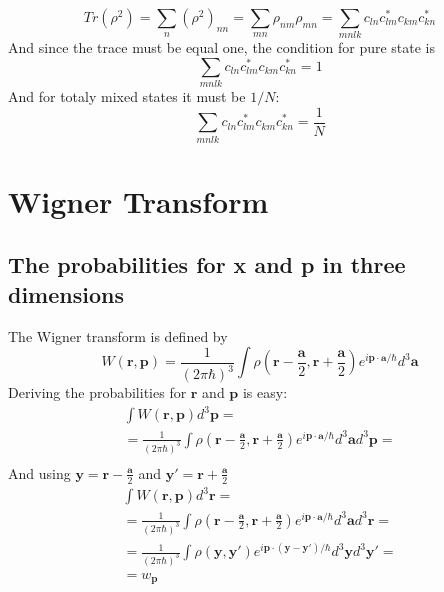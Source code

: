 \documentclass{article}
\begin{document}
\begin{equation}
    Tr(\rho^2) = \sum_n \left(\rho^2\right)_{nn} = \sum_{mn} \rho_{nm} \rho_{mn} = \sum_{mnlk} c_{ln} c_{lm}^* c_{km} c_{kn}^*
\end{equation}
And since the trace must be equal one, the condition for pure state is
\begin{equation}
    \sum_{mnlk} c_{ln} c_{lm}^* c_{km} c_{kn}^* = 1
\end{equation}
And for totaly mixed states it must be $1/N$:
\begin{equation}
    \sum_{mnlk} c_{ln} c_{lm}^* c_{km} c_{kn}^* = \frac{1}{N}
\end{equation}
\section{Wigner Transform}
\subsection{The probabilities for x and p in three dimensions}
The Wigner transform is defined by
\begin{equation}
    W(\boldsymbol{r},\boldsymbol{p}) = \frac{1}{(2\pi\hbar)^3} \int \rho\left(\boldsymbol{r} - \frac{\boldsymbol{a}}{2}, \boldsymbol{r} + \frac{\boldsymbol{a}}{2}\right)e^{i\boldsymbol{p}\cdot\boldsymbol{a}/\hbar}d^3\boldsymbol{a}
\end{equation}
Deriving the probabilities for $\boldsymbol{r}$ and $\boldsymbol{p}$ is easy:
\begin{equation}
\begin{gathered}
    \int W(\boldsymbol{r},\boldsymbol{p}) d^3\boldsymbol{p} = \\
    = \frac{1}{(2\pi\hbar)^3} \int \rho\left(\boldsymbol{r} - \frac{\boldsymbol{a}}{2}, \boldsymbol{r} + \frac{\boldsymbol{a}}{2}\right)e^{i\boldsymbol{p}\cdot\boldsymbol{a}/\hbar}d^3\boldsymbol{a}d^3\boldsymbol{p} = \\
\end{gathered}
\end{equation}
And using $\boldsymbol{y} = \boldsymbol{r} - \frac{\boldsymbol{a}}{2}$ and $\boldsymbol{y'} = \boldsymbol{r} + \frac{\boldsymbol{a}}{2}$
\begin{equation}
\begin{gathered}
    \int W(\boldsymbol{r},\boldsymbol{p}) d^3\boldsymbol{r} = \\
    = \frac{1}{(2\pi\hbar)^3} \int \rho\left(\boldsymbol{r} - \frac{\boldsymbol{a}}{2}, \boldsymbol{r} + \frac{\boldsymbol{a}}{2}\right)e^{i\boldsymbol{p}\cdot\boldsymbol{a}/\hbar}d^3\boldsymbol{a}d^3\boldsymbol{r} = \\
    = \frac{1}{(2\pi\hbar)^3} \int \rho\left(\boldsymbol{y}, \boldsymbol{y'}\right)e^{i\boldsymbol{p}\cdot(\boldsymbol{y - y'})/\hbar}d^3\boldsymbol{y}d^3\boldsymbol{y'} = \\
    = w_{\boldsymbol{p}}
\end{gathered}
\end{equation}
\end{document}
